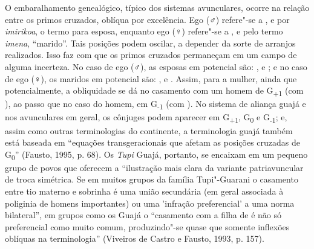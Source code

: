 O embaralhamento genealógico, típico dos sistemas avunculares, ocorre na
relação entre os primos cruzados, oblíqua por excelência. Ego (♂)
refere"-se a ,  e  por \emph{imirikoa}, o termo para esposa,
enquanto ego (♀) refere"-se a ,  e  pelo termo \emph{imena},
``marido''. Tais posições podem oscilar, a depender da sorte de arranjos
realizados. Isso faz com que os primos cruzados permaneçam em um campo
de alguma incerteza. No caso de ego (♂), as esposas em potencial são:
,  e ; e no caso de ego (♀), os maridos em potencial são: ,
 e . Assim, para a mulher, ainda que potencialmente, a obliquidade
se dá no casamento com um homem de G\textsubscript{+1} (com ), ao
passo que no caso do homem, em G\textsubscript{-1} (com ). No sistema
de aliança guajá e nos avunculares em geral, os cônjuges podem aparecer
em G\textsubscript{+1}, G\textsubscript{0} e G\textsubscript{-1}; e,
assim como outras terminologias do continente, a terminologia guajá
também está baseada em ``equações transgeracionais que afetam as
posições cruzadas de G\textsubscript{0}'' (Fausto, 1995, p. 68). Os
\emph{Tupi} Guajá, portanto, se encaixam em um pequeno grupo de povos
que oferecem a ``ilustração mais clara da variante patriavuncular de
troca simétrica. Se em muitos grupos da família Tupi"-Guarani o casamento
entre tio materno e sobrinha é uma união secundária (em geral associada
à poliginia de homens importantes) ou uma 'infração preferencial' a uma
norma bilateral'', em grupos como os Guajá o ``casamento com a filha de 
é não só preferencial como muito comum, produzindo"-se quase que somente
inflexões oblíquas na terminologia'' (Viveiros de Castro e Fausto, 1993,
p. 157).

